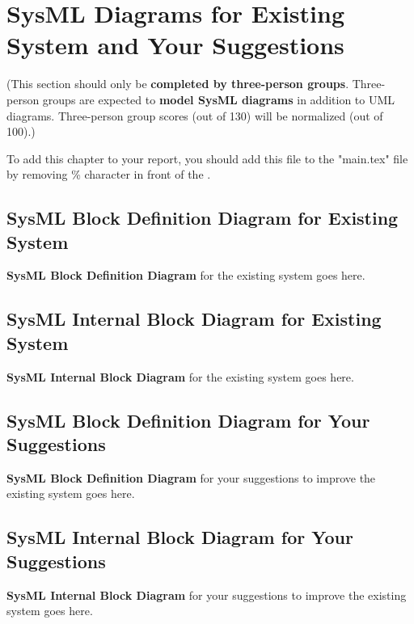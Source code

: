 \chapter{SysML Diagrams for Existing System and Your Suggestions} \label{sysml}
(This section should only be \textbf{completed by three-person groups}. Three-person groups are expected to \textbf{model SysML diagrams} in addition to UML diagrams. Three-person group scores (out of 130) will be normalized (out of 100).) 

To add this chapter to your report, you should add this file to the "main.tex" file by removing \% character in front of the \verb||.


\section{SysML Block Definition Diagram for Existing System }

\textbf{SysML Block Definition Diagram} for the existing system goes here.


\section{SysML Internal Block Diagram for Existing System}

\textbf{SysML Internal Block Diagram} for the existing system goes here.

\section{SysML Block Definition Diagram for Your Suggestions} 

\textbf{SysML Block Definition Diagram} for your suggestions to improve the existing system goes here.

\section{SysML Internal Block Diagram for Your Suggestions}

\textbf{SysML Internal Block Diagram} for your suggestions to improve the existing system goes here. 
